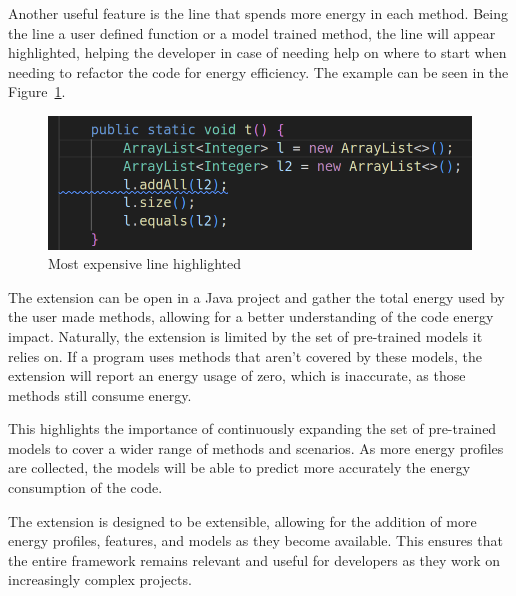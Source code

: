 Another useful feature is the line that spends more energy in each method. Being the line a user defined function or a model trained method, the line will appear highlighted, helping the developer in case of needing help on where to start when needing to refactor the code for energy efficiency. The example can be seen in the Figure~\ref{fig:most_expensive_line}.

\begin{figure}[htbp]
  \centering
  \includegraphics[width = .6 \textwidth]{figures/most_expensive_line.png}
  \caption{Most expensive line highlighted}
  \label{fig:most_expensive_line}
\end{figure}

The extension can be open in a Java project and gather the total energy used by the user made methods, allowing for a better understanding of the code energy impact. Naturally, the extension is limited by the set of pre-trained models it relies on. If a program uses methods that aren't covered by these models, the extension will report an energy usage of zero, which is inaccurate, as those methods still consume energy.

This highlights the importance of continuously expanding the set of pre-trained models to cover a wider range of methods and scenarios. As more energy profiles are collected, the models will be able to predict more accurately the energy consumption of the code.

The extension is designed to be extensible, allowing for the addition of more energy profiles, features,  and models as they become available. This ensures that the entire framework remains relevant and useful for developers as they work on increasingly complex projects.